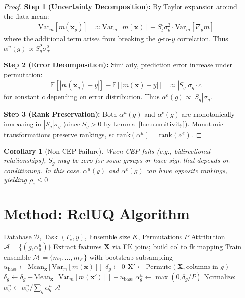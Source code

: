 \documentclass{article}
\newtheorem{corollary}{Corollary}
\begin{document}
\begin{proof}
\textbf{Step 1 (Uncertainty Decomposition):}
By Taylor expansion around the data mean:
\begin{align}
\text{Var}_m[m(\tilde{\mathbf{x}}_g)] &\approx \text{Var}_m[m(\mathbf{x})] + S_g^2 \sigma_g^2 \cdot \text{Var}_m[\nabla_g m]
\end{align}
where the additional term arises from breaking the $g$-to-$y$ correlation.
Thus $\alpha^u(g) \propto S_g^2 \sigma_g^2$.

\textbf{Step 2 (Error Decomposition):}
Similarly, prediction error increase under permutation:
\begin{align}
\mathbb{E}[|m(\tilde{\mathbf{x}}_g) - y|] - \mathbb{E}[|m(\mathbf{x}) - y|] &\approx |S_g| \sigma_g \cdot c
\end{align}
for constant $c$ depending on error distribution. Thus $\alpha^e(g) \propto |S_g| \sigma_g$.

\textbf{Step 3 (Rank Preservation):}
Both $\alpha^u(g)$ and $\alpha^e(g)$ are monotonically increasing in $|S_g| \sigma_g$
(since $S_g > 0$ by Lemma~\ref{lem:sensitivity}). Monotonic transformations preserve
rankings, so $\text{rank}(\alpha^u) = \text{rank}(\alpha^e)$.
\end{proof}

\begin{corollary}[Non-CEP Failure]
\label{cor:noncep}
When CEP fails (e.g., bidirectional relationships), $S_g$ may be zero for some groups
or have sign that depends on conditioning. In this case, $\alpha^u(g)$ and $\alpha^e(g)$
can have opposite rankings, yielding $\rho_s \leq 0$.
\end{corollary}

\section{Method: RelUQ Algorithm}
\label{sec:method}

\begin{algorithm}[t]
\caption{RelUQ: FK-Level Uncertainty Attribution}
\label{alg:reluq}
\begin{algorithmic}[1]
\Require Database $\mathcal{D}$, Task $(T_e, y)$, Ensemble size $K$, Permutations $P$
\Ensure Attribution $\mathcal{A} = \{(g, \alpha^u_g)\}$
\State Extract features $\mathbf{X}$ via FK joins; build $\text{col\_to\_fk}$ mapping
\State Train ensemble $\mathcal{M} = \{m_1, \ldots, m_K\}$ with bootstrap subsampling
\State $u_{\text{base}} \gets \text{Mean}_{\mathbf{x}}[\text{Var}_{m}[m(\mathbf{x})]]$
    \State $\delta_g \gets 0$
        \State $\mathbf{X}' \gets \text{Permute}(\mathbf{X}, \text{columns in } g)$
        \State $\delta_g \gets \delta_g + \text{Mean}_{\mathbf{x}}[\text{Var}_m[m(\mathbf{x}')]] - u_{\text{base}}$
    \EndFor
    \State $\alpha^u_g \gets \max(0, \delta_g / P)$
\EndFor
\State Normalize: $\alpha^u_g \gets \alpha^u_g / \sum_g \alpha^u_g$
\State \Return $\mathcal{A}$
\end{algorithmic}
\end{algorithm}
\end{document}
